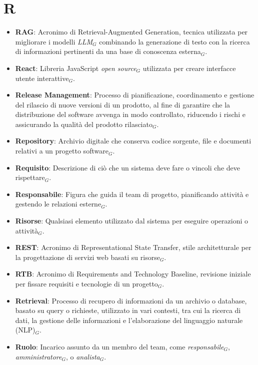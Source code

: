 \section{R} 
\begin{itemize}
\item \textbf{RAG}: Acronimo di Retrieval-Augmented Generation, tecnica utilizzata per migliorare i modelli 
\textit{LLM}$_G$ combinando la generazione di testo con la ricerca di informazioni pertinenti da una base di conoscenza esterna$_G$. 
\item \textbf{React}: Libreria JavaScript \textit{open source}$_G$ utilizzata per creare interfacce utente interattive$_G$. 
\item \textbf{Release Management}: Processo di pianificazione, coordinamento e gestione del rilascio di nuove versioni di un prodotto, al fine di garantire che la distribuzione del software avvenga in modo controllato, riducendo i rischi e assicurando la qualità del prodotto rilasciato$_G$.
\item \textbf{Repository}: Archivio digitale che conserva codice sorgente, file e documenti relativi a un progetto software$_G$. \item \textbf{Requisito}: Descrizione di ciò che un sistema deve fare o vincoli che deve rispettare$_G$.
\item \textbf{Responsabile}: Figura che guida il team di progetto, pianificando attività e gestendo le relazioni esterne$_G$.
\item \textbf{Risorse}: Qualsiasi elemento utilizzato dal sistema per eseguire operazioni o attività$_G$.
\item \textbf{REST}: Acronimo di Representational State Transfer, stile architetturale per la progettazione di servizi web basati su risorse$_G$.
\item \textbf{RTB}: Acronimo di Requirements and Technology Baseline, revisione iniziale per fissare requisiti e tecnologie di un progetto$_G$.
\item \textbf{Retrieval}: Processo di recupero di informazioni da un archivio o database, basato su query o richieste, utilizzato in vari contesti, tra cui la ricerca di dati, la gestione delle informazioni e l'elaborazione del linguaggio naturale (NLP)$_G$.
\item \textbf{Ruolo}: Incarico assunto da un membro del team, come \textit{responsabile}$_G$, \textit{amministratore}$_G$, o \textit{analista}$_G$.
\end{itemize}